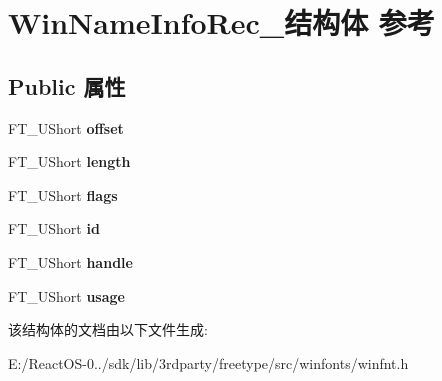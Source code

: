 \hypertarget{struct_win_name_info_rec__}{}\section{Win\+Name\+Info\+Rec\+\_\+结构体 参考}
\label{struct_win_name_info_rec__}
\subsection*{Public 属性}
\begin{DoxyCompactItemize}
\item 
\mbox{\label{struct_win_name_info_rec___ac63ab31a4e61ccd3864065ab56bd78e6}} 
F\+T\+\_\+\+U\+Short {\bfseries offset}
\item 
\mbox{\label{struct_win_name_info_rec___aeda4a5eae2a18c36daeeb6a72d8bfbb4}} 
F\+T\+\_\+\+U\+Short {\bfseries length}
\item 
\mbox{\label{struct_win_name_info_rec___addbceb45daa8fd8449679413b13a9267}} 
F\+T\+\_\+\+U\+Short {\bfseries flags}
\item 
\mbox{\label{struct_win_name_info_rec___af961a5491c8d331ca20d9baa5d122148}} 
F\+T\+\_\+\+U\+Short {\bfseries id}
\item 
\mbox{\label{struct_win_name_info_rec___a9f8cbc17f927b8fda21ab4dc539aee7d}} 
F\+T\+\_\+\+U\+Short {\bfseries handle}
\item 
\mbox{\label{struct_win_name_info_rec___ae922346926091cbbbcd7dd551bf7d4d7}} 
F\+T\+\_\+\+U\+Short {\bfseries usage}
\end{DoxyCompactItemize}


该结构体的文档由以下文件生成\+:\begin{DoxyCompactItemize}
\item 
E\+:/\+React\+O\+S-\/0../sdk/lib/3rdparty/freetype/src/winfonts/winfnt.\+h\end{DoxyCompactItemize}
